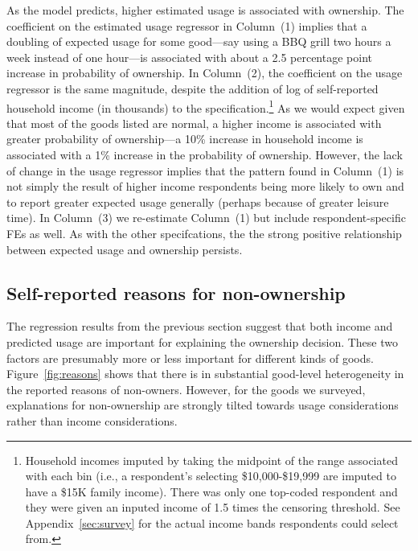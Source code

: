 \documentclass[11pt]{article}
\begin{document}
As the model predicts, higher estimated usage is associated with ownership.
The coefficient on the estimated usage regressor in Column~(1) implies that a doubling of expected usage for some good---say using a BBQ grill two hours a week instead of one hour---is associated with about a 2.5 percentage point increase in probability of ownership. 
In Column~(2), the coefficient on the usage regressor is the same magnitude, despite the addition of log of self-reported household income (in thousands) to the specification.\footnote{
  Household incomes imputed by taking the midpoint of the range associated with each bin (i.e., a respondent's selecting \$10,000-\$19,999 are imputed to have a \$15K family income).
  There was only one top-coded respondent and they were given an inputed income of 1.5 times the censoring threshold.
  See Appendix~\ref{sec:survey} for the actual income bands respondents could select from.
  }
As we would expect given that most of the goods listed are normal, a higher income is associated with greater probability of ownership---a 10\% increase in household income is associated with a 1\% increase in the probability of ownership.  
However, the lack of change in the usage regressor implies that the pattern found in Column~(1) is not simply the result of higher income respondents being more likely to own and to report greater expected usage generally (perhaps because of greater leisure time). 
In Column~(3) we re-estimate Column~(1) but include respondent-specific FEs as well.
As with the other specifcations, the the strong positive relationship between expected usage and ownership persists. 

\subsection{Self-reported reasons for non-ownership}

The regression results from the previous section suggest that both income and predicted usage are important for explaining the ownership decision. 
These two factors are presumably more or less important for different kinds of goods.
Figure~\ref{fig:reasons} shows that there is in substantial good-level heterogeneity in the reported reasons of non-owners.
However, for the goods we surveyed, explanations for non-ownership are strongly tilted towards usage considerations rather than income considerations.
\end{document}

